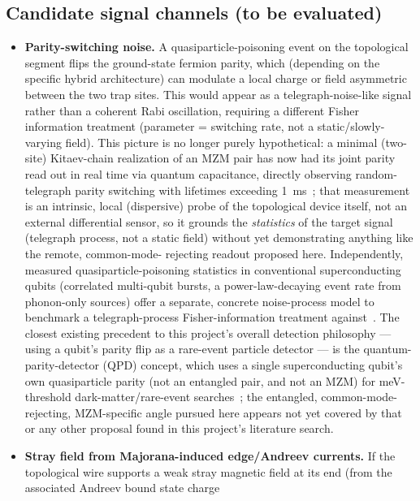 \documentclass[aps,pra,reprint,superscriptaddress,longbibliography]{revtex4-2}
\begin{document}
\subsection{Candidate signal channels (to be evaluated)}

\begin{itemize}
  \item \textbf{Parity-switching noise.} A quasiparticle-poisoning event on the topological segment
  flips the ground-state fermion parity, which (depending on the specific hybrid architecture) can
  modulate a local charge or field asymmetric between the two trap sites. This would appear as a
  telegraph-noise-like signal rather than a coherent Rabi oscillation, requiring a different Fisher
  information treatment (parameter = switching rate, not a static/slowly-varying field). This picture
  is no longer purely hypothetical: a minimal (two-site) Kitaev-chain realization of an MZM pair has
  now had its joint parity read out in real time via quantum capacitance, directly observing
  random-telegraph parity switching with lifetimes exceeding 1~ms~\cite{vanloo2026kitaev}; that
  measurement is an intrinsic, local (dispersive) probe of the topological device itself, not an
  external differential sensor, so it grounds the \emph{statistics} of the target signal (telegraph
  process, not a static field) without yet demonstrating anything like the remote, common-mode-
  rejecting readout proposed here. Independently, measured quasiparticle-poisoning statistics in
  conventional superconducting qubits (correlated multi-qubit bursts, a power-law-decaying event
  rate from phonon-only sources) offer a separate, concrete noise-process model to benchmark
  a telegraph-process Fisher-information treatment against~\cite{yelton2025correlated}. The closest
  existing precedent to this project's overall detection philosophy — using a qubit's parity flip as
  a rare-event particle detector — is the quantum-parity-detector (QPD) concept, which uses a single
  superconducting qubit's own quasiparticle parity (not an entangled pair, and not an MZM) for
  meV-threshold dark-matter/rare-event searches~\cite{ramanathan2026parity}; the entangled,
  common-mode-rejecting, MZM-specific angle pursued here appears not yet covered by that or any other
  proposal found in this project's literature search.
  \item \textbf{Stray field from Majorana-induced edge/Andreev currents.} If the topological wire
  supports a weak stray magnetic field at its end (from the associated Andreev bound state charge

\end{itemize}
\end{document}
